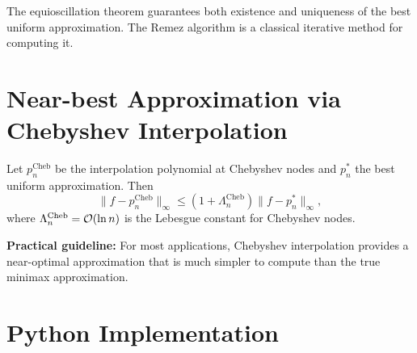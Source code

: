 \begin{remark}
The equioscillation theorem guarantees both existence and uniqueness of the best uniform approximation. The Remez algorithm is a classical iterative method for computing it.
\end{remark}

\section{Near-best Approximation via Chebyshev Interpolation}

\begin{theorem}
\label{thm:near-best}
Let $p_n^{\mathrm{Cheb}}$ be the interpolation polynomial at Chebyshev nodes and $p_n^*$ the best uniform approximation. Then
\[
    \|f - p_n^{\mathrm{Cheb}}\|_\infty \leq \left(1 + \Lambda_n^{\mathrm{Cheb}}\right) \|f - p_n^*\|_\infty,
\]
where $\Lambda_n^{\mathrm{Cheb}} = \mathcal{O}(\ln n)$ is the Lebesgue constant for Chebyshev nodes.
\end{theorem}

\begin{method}
\textbf{Practical guideline:} For most applications, Chebyshev interpolation provides a near-optimal approximation that is much simpler to compute than the true minimax approximation.
\end{method}

\section{Python Implementation}

